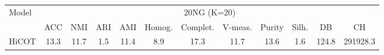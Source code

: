 \begin{tabular}{lccccccccccc}
\toprule
Model & \multicolumn{11}{c}{20NG (K=20)} \\
 & ACC & NMI & ARI & AMI & Homog. & Complet. & V-meas. & Purity & Silh. & DB & CH \\
\midrule
HiCOT & 13.3 & 11.7 & 1.5 & 11.4 & 8.9 & 17.3 & 11.7 & 13.6 & 1.6 & 124.8 & 291928.3 \\
\bottomrule
\end{tabular}
